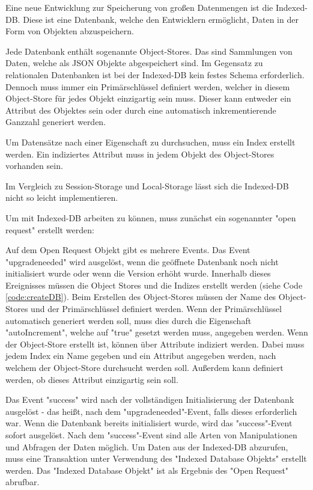 
Eine neue Entwicklung zur Speicherung von großen Datenmengen ist die Indexed-DB. 
Diese ist eine Datenbank, welche den Entwicklern ermöglicht, Daten in der Form von Objekten abzuspeichern.

Jede Datenbank enthält sogenannte Object-Stores. Das sind Sammlungen von Daten, welche als JSON Objekte abgespeichert sind. 
Im Gegensatz zu relationalen Datenbanken ist bei der Indexed-DB kein festes Schema erforderlich. 
Dennoch muss immer ein Primärschlüssel definiert werden, welcher in diesem Object-Store für jedes Objekt einzigartig sein muss.
Dieser kann entweder ein Attribut des Objektes sein oder durch eine automatisch inkrementierende Ganzzahl generiert werden. 

Um Datensätze nach einer Eigenschaft zu durchsuchen, muss ein Index erstellt werden. Ein indiziertes Attribut muss in jedem Objekt des Object-Stores vorhanden sein.

Im Vergleich zu Session-Storage und Local-Storage lässt sich die Indexed-DB nicht so leicht implementieren.

Um mit Indexed-DB arbeiten zu können, muss zunächst ein sogenannter "open request" erstellt werden:


Auf dem Open Request Objekt gibt es mehrere Events. 
Das Event "upgradeneeded" wird ausgelöst, wenn die geöffnete Datenbank noch nicht initialisiert wurde oder wenn die Version erhöht wurde. 
Innerhalb dieses Ereignisses müssen die Object Stores und die Indizes erstellt werden (siehe Code \ref{code:createDB}). 
Beim Erstellen des Object-Stores müssen der Name des Object-Stores und der Primärschlüssel definiert werden. Wenn der Primärschlüssel automatisch generiert werden soll, muss dies durch die Eigenschaft "autoIncrement", welche auf "true" gesetzt werden muss, angegeben werden.
Wenn der Object-Store erstellt ist, können über Attribute indiziert werden. Dabei muss jedem Index ein Name gegeben und ein Attribut angegeben werden, nach welchem der Object-Store durchsucht werden soll. Außerdem kann definiert werden, ob dieses Attribut einzigartig sein soll.


Das Event "success" wird nach der vollständigen Initialisierung der Datenbank ausgelöst - 
das heißt, nach dem "upgradeneeded"-Event, falls dieses erforderlich war. 
Wenn die Datenbank bereits initialisiert wurde, wird das "success"-Event sofort ausgelöst. 
Nach dem "success"-Event sind alle Arten von Manipulationen und Abfragen der Daten möglich. 
Um Daten aus der Indexed-DB abzurufen, muss eine Transaktion unter Verwendung des "Indexed Database Objekts" erstellt werden. 
Das "Indexed Database Objekt" ist als Ergebnis des "Open Request" abrufbar.

